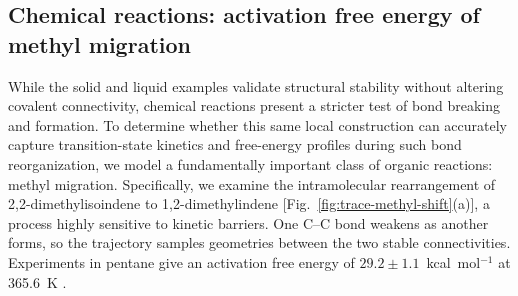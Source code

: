 \documentclass[aps,prx,preprint,notitlepage,superscriptaddress,nofootinbib,floatfix]{revtex4-2}
\newif\ifshowrevisions
\newcommand{\drafttwentyseven}[1]{%
  \ifshowrevisions\textcolor{drafttwentysevencolor}{#1}\else#1\fi}
\begin{document}


\subsection{Chemical reactions: activation free energy of methyl migration}

While the solid and liquid examples validate structural stability without altering covalent connectivity, chemical reactions present a stricter test of bond breaking and formation. To determine whether this same local construction can accurately capture transition-state kinetics and free-energy profiles during such bond reorganization, we model a fundamentally important class of organic reactions: methyl migration. Specifically, we examine the intramolecular rearrangement of 2,2-dimethylisoindene to 1,2-dimethylindene [Fig.~\ref{fig:trace-methyl-shift}(a)], a process highly sensitive to kinetic barriers. One C--C bond weakens as another forms, so the trajectory samples geometries between the two stable connectivities. Experiments in pentane give an activation free energy of $29.2\pm1.1$~kcal~mol$^{-1}$ at 365.6~K \cite{dolbier1979,manning1981,vitartas2026}.
\end{document}

